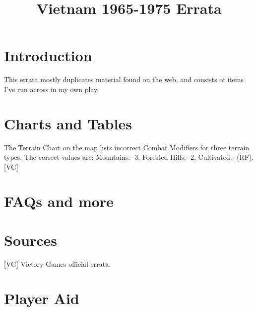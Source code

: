 \documentclass[10pt]{article}
\title{Vietnam 1965-1975 Errata}
\begin{document}
\maketitle


\tableofcontents


\begin{multicols}{2}

\section{Introduction}

This errata mostly duplicates material found on the web, and
consists of items I've run across in my own play.

\section{Charts and Tables}

The Terrain Chart on the map lists incorrect Combat Modifiers for three terrain
types. The correct values are: Mountains: -3, Forested Hills: -2, Cultivated:
-(RF). [VG]

\section{FAQs and more}

\section{Sources}

[VG] Victory Games official errata.

\end{multicols}

\appendix

\section{Player Aid}
\end{document}
